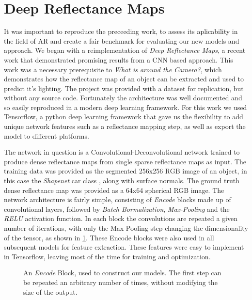 \documentclass[ %
                    author={Gavin Parker},
                supervisor={Dr. Neill Campbell},
                    degree={MEng},
                     title={Deep Siamese Networks for Illumination Estimation from Stereo Images},
                  subtitle={},
                      type={research},
                      year={2018} ]{dissertation}
\begin{document}
\section{Deep Reflectance Maps}
It was important to reproduce the preceeding work, to assess its aplicability in the field of AR and create a fair benchmark for evaluating our new models and approach. We began with a reimplementation of \textit{Deep Reflectance Maps}, a recent work that demonstrated promising results from a CNN based approach. This work was a necessary prerequisite to \textit{What is around the Camera?}, which demonstrates how the reflectance map of an object can be extracted and used to predict it's lighting. The project was provided with a dataset for replication, but without any source code. Fortunately the architecture was well documented and so easily reproduced in a modern deep learning framework. For this work we used Tensorflow, a python deep learning framework that gave us the flexibility to add unique network features such as a reflectance mapping step, as well as export the model to different platforms.

The network in question is a Convolutional-Deconvolutional network trained to produce dense reflectance maps from single sparse reflectance maps as input. The training data was provided as the segmented 256x256 RGB image of an object, in this case the \textit{Shapenet} car class \cite{DBLP:journals/corr/ChangFGHHLSSSSX15}, along with surface normals. The ground truth dense reflectance map was provided as a 64x64 spherical RGB image.
\newline
The network architecture is fairly simple, consisting of \textit{Encode} blocks made up of convolutional layers, followed by \textit{Batch Bormalization}, \textit{Max-Pooling} and the \textit{RELU} activation function. In each block the convolutions are repeated a given number of iterations, with only the Max-Pooling step changing the dimensionality of the tensor, as shown in \ref{encode}. These Encode blocks were also used in all subsequent models for feature extraction. These features were easy to implement in Tensorflow, leaving most of the time for training and optimization.
\begin{figure}[H]
\centering
{}

\caption{An \textit{Encode} Block, used to construct our models. The first step can be repeated an arbitrary number of times, without modifying the size of the output.}
\label{encode}
\end{figure}
\end{document}
